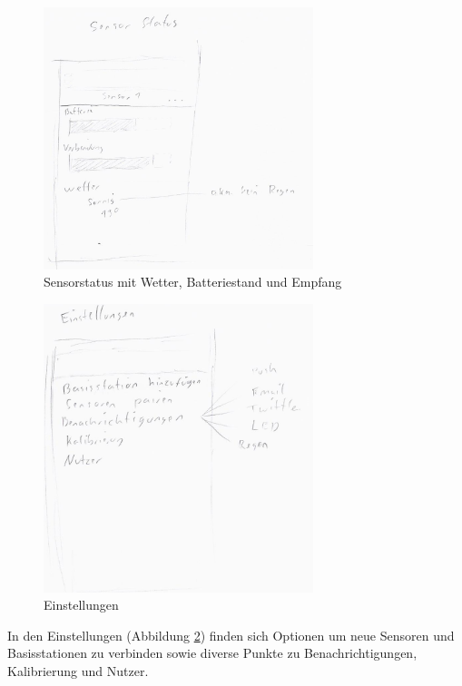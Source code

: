 \begin{figure}[htb] 
	\centerline{\includegraphics*[width=0.7\textwidth]{./Designs/AppGUIConcept_sensorStatus}}
	\caption{Sensorstatus mit Wetter, Batteriestand und Empfang}
	\label{gui_sensor_status}
\end{figure}
\begin{figure}[htb] 
	\centerline{\includegraphics*[width=0.7\textwidth]{./Designs/AppGUIConcept_settings}}
	\caption{Einstellungen}
	\label{gui_settings}
\end{figure}
In den Einstellungen (Abbildung \ref{gui_settings}) finden sich Optionen um neue Sensoren und Basisstationen zu verbinden sowie diverse Punkte zu Benachrichtigungen, Kalibrierung und Nutzer.
\FloatBarrier

